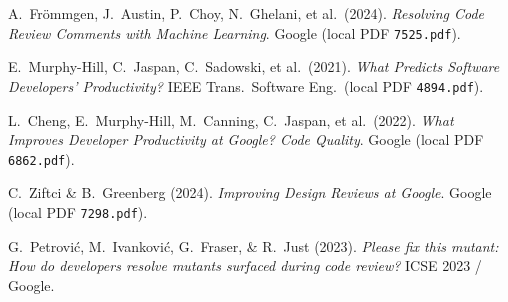 \documentclass[10pt,letterpaper]{article}
\newcommand{\code}[1]{\texttt{\color{InkNavy}#1}}
\begin{document}
\begin{enumerate}[label={[\arabic*]}, leftmargin=2.2em, itemsep=1.1pt]
  \item A.\ Fr\"{o}mmgen, J.\ Austin, P.\ Choy, N.\ Ghelani, et al.\ (2024). \emph{Resolving Code Review Comments with Machine Learning}. Google (local PDF \code{7525.pdf}).
  \item E.\ Murphy-Hill, C.\ Jaspan, C.\ Sadowski, et al.\ (2021). \emph{What Predicts Software Developers' Productivity?} IEEE Trans.\ Software Eng.\ (local PDF \code{4894.pdf}).
  \item L.\ Cheng, E.\ Murphy-Hill, M.\ Canning, C.\ Jaspan, et al.\ (2022). \emph{What Improves Developer Productivity at Google? Code Quality}. Google (local PDF \code{6862.pdf}).
  \item C.\ Ziftci \& B.\ Greenberg (2024). \emph{Improving Design Reviews at Google}. Google (local PDF \code{7298.pdf}).
  \item G.\ Petrovi\'{c}, M.\ Ivankovi\'{c}, G.\ Fraser, \& R.\ Just (2023). \emph{Please fix this mutant: How do developers resolve mutants surfaced during code review?} ICSE 2023 / Google.
\end{enumerate}

\normalsize
\end{document}
